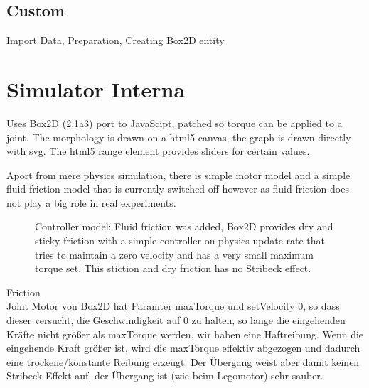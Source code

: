 \documentclass[10pt,a4paper]{article}
\begin{document}
\subsection{Custom}

Import Data, Preparation, Creating Box2D entity

\section{Simulator Interna}
\label{sim_internal}

Uses Box2D (2.1a3) port to JavaScipt, patched so torque can be applied to a joint.
The morphology is drawn on a html5 canvas, the graph is drawn directly with svg.
The html5 range element provides sliders for certain values.

Aport from mere physics simulation, there is simple motor model and a simple fluid friction model that is currently switched off however as fluid friction does not play a big role in real experiments.

\begin{figure}[H]
    \centering
    
    \caption{Controller model: Fluid friction was added, Box2D provides dry and sticky friction with a simple controller on physics update rate that tries to maintain a zero velocity and has a very small maximum torque set. This stiction and dry friction has no Stribeck effect. }
    \label{fig:controllermodell}
\end{figure}

Friction\\

Joint Motor von Box2D hat Paramter maxTorque und setVelocity 0, so dass dieser versucht, die Geschwindigkeit auf 0 zu halten, so lange die eingehenden Kräfte nicht größer als maxTorque werden, wir haben eine Haftreibung. Wenn die eingehende Kraft größer ist, wird die maxTorque effektiv abgezogen und dadurch eine trockene/konstante Reibung erzeugt.
Der Übergang weist aber damit keinen Stribeck-Effekt auf, der Übergang ist (wie beim Legomotor) sehr sauber.
\end{document}

